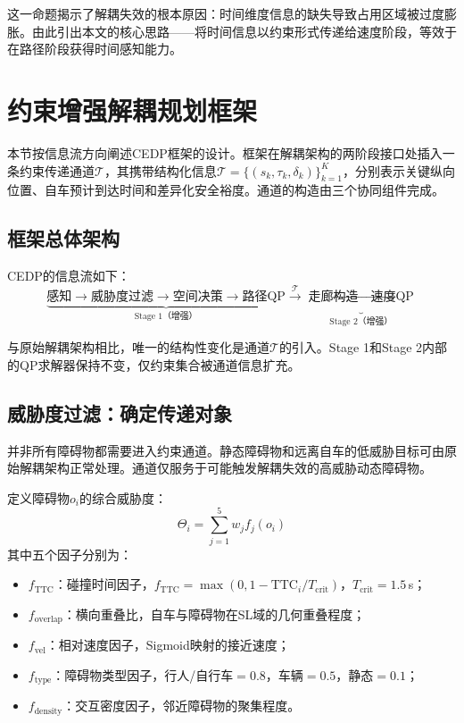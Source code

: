 \documentclass[a4paper,11pt]{article}
\begin{document}
这一命题揭示了解耦失效的根本原因：时间维度信息的缺失导致占用区域被过度膨胀。由此引出本文的核心思路——将时间信息以约束形式传递给速度阶段，等效于在路径阶段获得时间感知能力。

\section{约束增强解耦规划框架}

本节按信息流方向阐述CEDP框架的设计。框架在解耦架构的两阶段接口处插入一条约束传递通道$\mathcal{T}$，其携带结构化信息$\mathcal{T} = \{(s_k, \tau_k, \delta_k)\}_{k=1}^{K}$，分别表示关键纵向位置、自车预计到达时间和差异化安全裕度。通道的构造由三个协同组件完成。

\subsection{框架总体架构}

CEDP的信息流如下：
\begin{equation}
\underbrace{\text{感知} \to \text{威胁度过滤} \to \text{空间决策} \to \text{路径QP}}_{\text{Stage 1（增强）}}
\xrightarrow{\;\mathcal{T}\;}
\underbrace{\text{走廊构造} \to \text{速度QP}}_{\text{Stage 2（增强）}}
\end{equation}

与原始解耦架构相比，唯一的结构性变化是通道$\mathcal{T}$的引入。Stage 1和Stage 2内部的QP求解器保持不变，仅约束集合被通道信息扩充。

\subsection{威胁度过滤：确定传递对象}

并非所有障碍物都需要进入约束通道。静态障碍物和远离自车的低威胁目标可由原始解耦架构正常处理。通道仅服务于可能触发解耦失效的高威胁动态障碍物。

定义障碍物$o_i$的综合威胁度：
\begin{equation}
  \Theta_i = \sum_{j=1}^{5} w_j f_j(o_i)
\end{equation}
其中五个因子分别为：
\begin{itemize}
  \item $f_{\text{TTC}}$：碰撞时间因子，$f_{\text{TTC}} = \max(0, 1 - \text{TTC}_i / T_{\text{crit}})$，$T_{\text{crit}} = 1.5$\,s；
  \item $f_{\text{overlap}}$：横向重叠比，自车与障碍物在SL域的几何重叠程度；
  \item $f_{\text{vel}}$：相对速度因子，Sigmoid映射的接近速度；
  \item $f_{\text{type}}$：障碍物类型因子，行人/自行车$= 0.8$，车辆$= 0.5$，静态$= 0.1$；
  \item $f_{\text{density}}$：交互密度因子，邻近障碍物的聚集程度。
\end{itemize}
\end{document}
